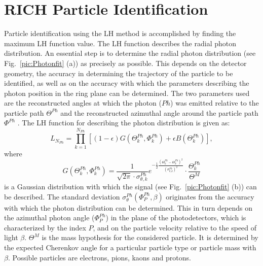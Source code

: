 \section{RICH Particle Identification}

Particle identification using the LH method is accomplished by finding the maximum LH function value. The LH function describes the radial photon distribution. An essential step is to determine the radial photon distribution (see Fig.~\ref{pic:Photonfit} (a)) as precisely as possible. This depends on the detector geometry, the accuracy in determining the trajectory of the particle to be identified, as well as on the accuracy with which the parameters describing the photon position in the ring plane can be determined. The two parameters used are the reconstructed angles at which the photon ($Ph$) was emitted relative to the particle path $\Theta^{Ph}$ and the reconstructed azimuthal angle around the particle path $\Phi^{Ph}$ \cite{Pfit1,Pfit2,Pfit3}. The LH function for describing the photon distribution is given as:
%
\begin{equation}
  L_{N_{Ph}} = \prod_{k=1}^{N_{Ph}} \left[ (1-\epsilon) G\left(\Theta_k^{Ph},\Phi_k^{Ph} \right) + \epsilon B\left(\Theta_k^{Ph} \right) \right],
\end{equation}
%
where
%
\begin{equation}
  G\left(\Theta_k^{Ph},\Phi_k^{Ph} \right) = \frac{1}{\sqrt{2\pi} \cdot \sigma_{\theta,k}^{Ph}} e^{-\frac{1}{2}\frac{\left(\Theta_k^{Ph}-\Theta_k^{Ph} \right)^2}{\left(\sigma_{\theta,k}^{Ph} \right)^2}} \cdot \frac{\Theta_k^{Ph}}{\Theta^{M}}
\end{equation}
%
is a Gaussian distribution with which the signal (see Fig.~\ref{pic:Photonfit} (b)) can be described. The standard deviation $\sigma_{\theta}^{Ph}(\Phi_P^{Ph},\beta)$ originates from the accuracy with which the photon distribution can be determined. This in turn depends on the azimuthal photon angle ($\Phi_P^{Ph}$) in the plane of the photodetectors, which is characterized by the index $P$, and on the particle velocity relative to the speed of light $\beta$. $\Theta^M$ is the mass hypothesis for the considered particle. It is determined by the expected Cherenkov angle for a particular particle type or particle mass with $\beta$. Possible particles are electrons, pions, kaons and protons.


